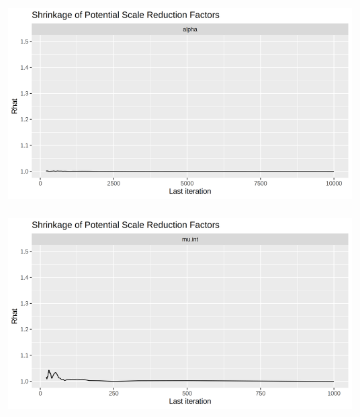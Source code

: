 \documentclass[12pt]{article}
\begin{document}
\begin{figure}[h!]
    \centering
    \begin{subfigure}{0.45\textwidth}
        \includegraphics[width=\linewidth]{pictures/centered/centgbralpha.png}
    \end{subfigure}
    \begin{subfigure}{0.45\textwidth}
        \includegraphics[width=\linewidth]{pictures/mod2/mod2gbr_muint.png}
    \end{subfigure}


\end{figure}
\end{document}
